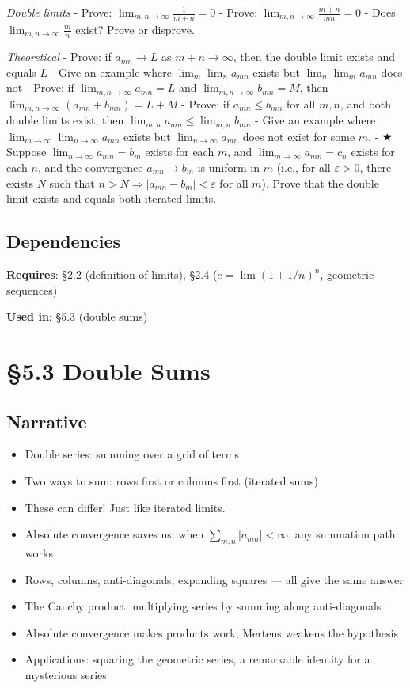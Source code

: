 \documentclass[
  10pt,
  letterpaper,
]{scrbook}
\providecommand{\tightlist}{%
  \setlength{\itemsep}{0pt}\setlength{\parskip}{0pt}}
\begin{document}
\emph{Double limits} - Prove:
\(\lim_{m,n \to \infty} \frac{1}{m + n} = 0\) - Prove:
\(\lim_{m,n \to \infty} \frac{m + n}{mn} = 0\) - Does
\(\lim_{m,n \to \infty} \frac{m}{n}\) exist? Prove or disprove.

\emph{Theoretical} - Prove: if \(a_{mn} \to L\) as \(m + n \to \infty\),
then the double limit exists and equals \(L\) - Give an example where
\(\lim_m \lim_n a_{mn}\) exists but \(\lim_n \lim_m a_{mn}\) does not -
Prove: if \(\lim_{m,n \to \infty} a_{mn} = L\) and
\(\lim_{m,n \to \infty} b_{mn} = M\), then
\(\lim_{m,n \to \infty} (a_{mn} + b_{mn}) = L + M\) - Prove: if
\(a_{mn} \leq b_{mn}\) for all \(m, n\), and both double limits exist,
then \(\lim_{m,n} a_{mn} \leq \lim_{m,n} b_{mn}\) - Give an example
where \(\lim_{m \to \infty} \lim_{n \to \infty} a_{mn}\) exists but
\(\lim_{n \to \infty} a_{mn}\) does not exist for some \(m\). - ★
Suppose \(\lim_{n \to \infty} a_{mn} = b_m\) exists for each \(m\), and
\(\lim_{m \to \infty} a_{mn} = c_n\) exists for each \(n\), and the
convergence \(a_{mn} \to b_m\) is uniform in \(m\) (i.e., for all
\(\varepsilon > 0\), there exists \(N\) such that
\(n > N \Rightarrow |a_{mn} - b_m| < \varepsilon\) for all \(m\)). Prove
that the double limit exists and equals both iterated limits.

\subsection{Dependencies}\label{dependencies-21}

\textbf{Requires}: §2.2 (definition of limits), §2.4
(\(e = \lim(1+1/n)^n\), geometric sequences)

\textbf{Used in}: §5.3 (double sums)

\section{§5.3 Double Sums}\label{double-sums}

\subsection{Narrative}\label{narrative-22}

\begin{itemize}
\tightlist
\item
  Double series: summing over a grid of terms
\item
  Two ways to sum: rows first or columns first (iterated sums)
\item
  These can differ! Just like iterated limits.
\item
  Absolute convergence saves us: when \(\sum_{m,n} |a_{mn}| < \infty\),
  any summation path works
\item
  Rows, columns, anti-diagonals, expanding squares --- all give the same
  answer
\item
  The Cauchy product: multiplying series by summing along anti-diagonals
\item
  Absolute convergence makes products work; Mertens weakens the
  hypothesis
\item
  Applications: squaring the geometric series, a remarkable identity for
  a mysterious series
\end{itemize}
\end{document}
